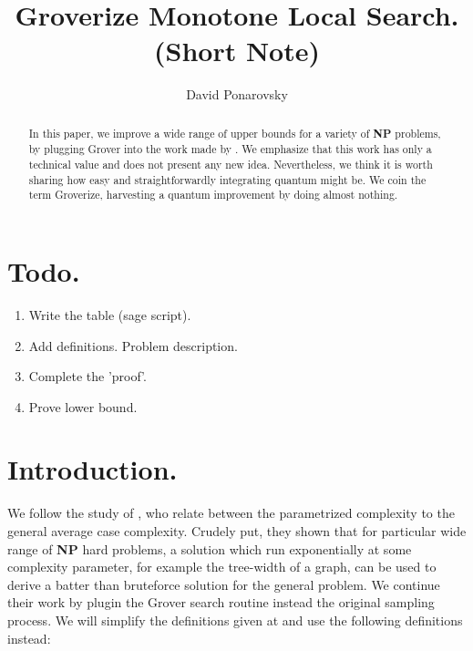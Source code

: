 \documentclass[manuscript,screen,review]{acmart}
\begin{document}


\title{Groverize Monotone Local Search. (Short Note)} 
\author{David Ponarovsky}

\ifdefined\ACM
\else
  \maketitle
\fi

\begin{abstract} 
In this paper, we improve a wide range of upper bounds for a variety of \textbf{NP} problems, by plugging Grover into the work made by \cite{fomin2015exact}. We emphasize that this work has only a technical value and does not present any new idea. Nevertheless, we think it is worth sharing how easy and straightforwardly integrating quantum might be. We coin the term Groverize, harvesting a quantum improvement by doing almost nothing.
\end{abstract}

%
\ifdefined\ACM
  \maketitle
\fi

% 
%


\newcommand{\Oh}{{\mathcal{O}}}
\newcommand{\bitsize}{N}
\newcommand{\longversion}[1]{#1}
\newcommand{\abpartization}{{\sc Vertex $(r,\ell)$-Partization}}


\section{Todo.}
\begin{enumerate}
  \item Write the table (sage script).
  \item Add definitions. Problem description.  
  \item Complete the 'proof'. 
  \item Prove lower bound. 
\end{enumerate}

\section{Introduction.} We follow the study of \cite{fomin2015exact}, who relate between the parametrized complexity to the general average case complexity. Crudely put, they shown that for particular wide range of \textbf{NP} hard problems, a solution which run exponentially at some complexity parameter, for example the tree-width of a graph, can be used to derive a batter than bruteforce solution for the general problem. We continue their work by plugin the Grover search   \cite{grover1996fast} routine instead the original sampling process.  We will simplify the definitions given at \cite{fomin2015exact} and use the following definitions instead:
\end{document}
